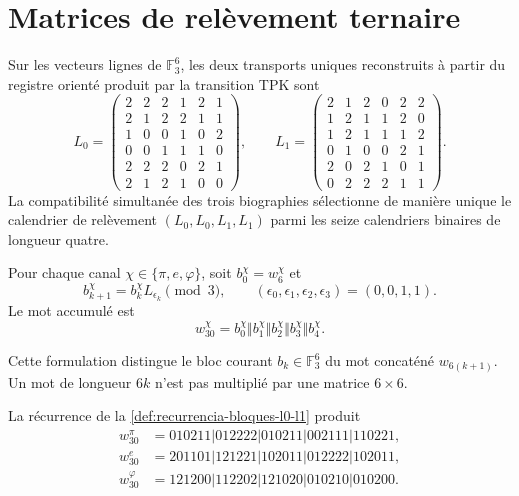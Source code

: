 \section{Matrices de relèvement ternaire}

Sur les vecteurs lignes de \(\mathbb F_3^6\), les deux transports uniques
reconstruits à partir du registre orienté produit par la transition TPK
sont
\[
L_0=
\begin{pmatrix}
2&2&2&1&2&1\\
2&1&2&2&1&1\\
1&0&0&1&0&2\\
0&0&1&1&1&0\\
2&2&2&0&2&1\\
2&1&2&1&0&0
\end{pmatrix},
\qquad
L_1=
\begin{pmatrix}
2&1&2&0&2&2\\
1&2&1&1&2&0\\
1&2&1&1&1&2\\
0&1&0&0&2&1\\
2&0&2&1&0&1\\
0&2&2&2&1&1
\end{pmatrix}.
\]
La compatibilité simultanée des trois biographies sélectionne de manière unique
le calendrier de relèvement \((L_0,L_0,L_1,L_1)\) parmi les seize
calendriers binaires de longueur quatre.

\begin{definition}
\label{def:recurrencia-bloques-l0-l1}
Pour chaque canal \(\chi\in\{\pi,e,\varphi\}\), soit
\(b_0^\chi=w_6^\chi\) et
\[
 b_{k+1}^\chi=b_k^\chi L_{\epsilon_k}\pmod3,
 \qquad
 (\epsilon_0,\epsilon_1,\epsilon_2,\epsilon_3)=(0,0,1,1).
\]
Le mot accumulé est
\[
 w_{30}^\chi
 =b_0^\chi\Vert b_1^\chi\Vert b_2^\chi
  \Vert b_3^\chi\Vert b_4^\chi.
\]
\end{definition}

Cette formulation distingue le bloc courant \(b_k\in\mathbb F_3^6\) du
mot concaténé \(w_{6(k+1)}\). Un mot de longueur \(6k\) n'est pas
multiplié par une matrice \(6\times6\).

\begin{theorem}
\label{thm:palabras-w30}
La récurrence de la \cref{def:recurrencia-bloques-l0-l1} produit
\begin{align*}
w_{30}^{\pi}
 &=010211|012222|010211|002111|110221,\\
w_{30}^{e}
 &=201101|121221|102011|012222|102011,\\
w_{30}^{\varphi}
 &=121200|112202|121020|010210|010200.
\end{align*}
\end{theorem}

